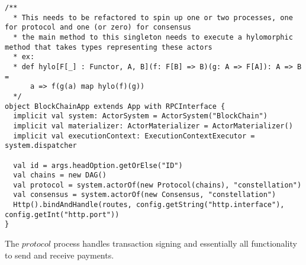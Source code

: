 \documentclass{article}
\begin{document}
\begin{lstlisting}
/**
  * This needs to be refactored to spin up one or two processes, one for protocol and one (or zero) for consensus
  * the main method to this singleton needs to execute a hylomorphic method that takes types representing these actors
  * ex:
  * def hylo[F[_] : Functor, A, B](f: F[B] => B)(g: A => F[A]): A => B =
      a => f(g(a) map hylo(f)(g))
  */
object BlockChainApp extends App with RPCInterface {
  implicit val system: ActorSystem = ActorSystem("BlockChain")
  implicit val materializer: ActorMaterializer = ActorMaterializer()
  implicit val executionContext: ExecutionContextExecutor = system.dispatcher
  
  val id = args.headOption.getOrElse("ID")
  val chains = new DAG()
  val protocol = system.actorOf(new Protocol(chains), "constellation")
  val consensus = system.actorOf(new Consensus, "constellation")
  Http().bindAndHandle(routes, config.getString("http.interface"), config.getInt("http.port"))
}

\end{lstlisting}

The $protocol$ process handles transaction signing and essentially all functionality to send and receive payments. 
\end{document}
